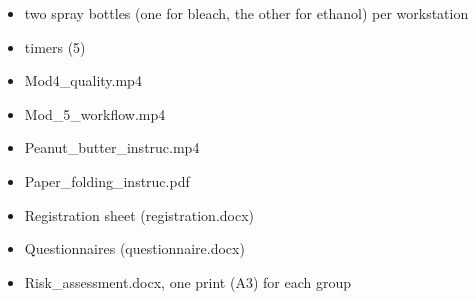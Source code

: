 \documentclass[
]{book}
\begin{document}
\begin{itemize}
\item
  two spray bottles (one for bleach, the other for ethanol) per workstation
\item
  timers (5)
\item
  Mod4\_quality.mp4
\item
  Mod\_5\_workflow.mp4
\item
  Peanut\_butter\_instruc.mp4
\item
  Paper\_folding\_instruc.pdf
\item
  Registration sheet (registration.docx)
\item
  Questionnaires (questionnaire.docx)
\item
  Risk\_assessment.docx, one print (A3) for each group
\end{itemize}
\end{document}
